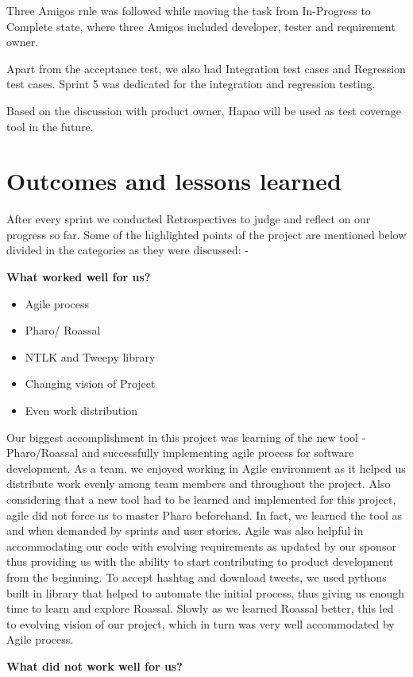 \documentclass[11pt]{article}
\begin{document}
Three Amigos rule was followed while moving the task from In-Progress to Complete state, where three Amigos included developer, tester and requirement owner.


Apart from the acceptance test, we also had Integration test cases and Regression test cases. Sprint 5 was dedicated for the integration and regression testing. 

Based on the discussion with product owner, Hapao will be used as test coverage tool in the future.

\section{Outcomes and lessons learned}
After every sprint we conducted Retrospectives to judge and reflect on our progress so far. Some of the highlighted points of the project are mentioned below divided in the categories as they were discussed: -

\textbf{What worked well for us?} 
\begin{itemize}
\item Agile process
\item Pharo/ Roassal
\item NTLK and Tweepy library
\item Changing vision of Project
\item Even work distribution
\end{itemize}

Our biggest accomplishment in this project was learning of the new tool - Pharo/Roassal and successfully implementing agile process for software development. As a team, we enjoyed working in Agile environment as it helped us distribute work evenly among team members and throughout the project. Also considering that a new tool had to be learned and implemented for this project, agile did not force us to master Pharo beforehand. In fact, we learned the tool as and when demanded by sprints and user stories. Agile was also helpful in accommodating our code with evolving requirements as updated by our sponsor thus providing us with the ability to start contributing to product development from the beginning. To accept hashtag and download tweets, we used pythons built in library that helped to automate the initial process, thus giving us enough time to learn and explore Roassal. Slowly as we learned Roassal better, this led to evolving vision of our project, which in turn was very well accommodated by Agile process.

\textbf{What did not work well for us?} 
\end{document}
